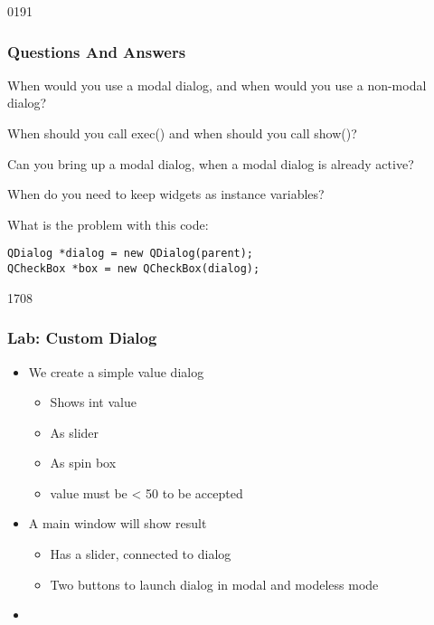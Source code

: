 \begin{slide}[fragile]{0191}
\frametitle{Questions And Answers}\label{dialogQuestions}
\begin{questionize}
\item When would you use a modal dialog, and when would you use a
  non-modal dialog?
\item When should you call exec() and when should you call show()?
\item Can you bring up a modal dialog, when a modal dialog is already
  active?
\item When do you need to keep widgets as instance variables?
\item What is the problem with this code:
\begin{lstlisting}
QDialog *dialog = new QDialog(parent);
QCheckBox *box = new QCheckBox(dialog);
\end{lstlisting}
\end{questionize}
\end{slide}

\begin{slide}{1708}
  \frametitle{Lab: Custom Dialog}
 \begin{itemize}
  \item We create a simple value dialog
    \begin{itemize}
    \item Shows int value
    \item As slider
    \item As spin box
    \item value must be < 50 to be accepted
   \end{itemize}
\item A main window will show result
   \begin{itemize}
   \item Has a slider, connected to dialog
   \item Two buttons to launch dialog in modal and modeless mode
   \end{itemize}
 \item {}
  \end{itemize}
\end{slide}
